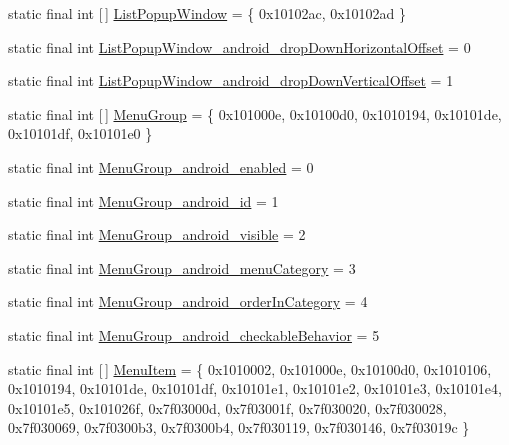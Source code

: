\begin{DoxyCompactItemize}
\item 
static final int \mbox{[}$\,$\mbox{]} \mbox{\hyperlink{classandroid_1_1support_1_1v7_1_1appcompat_1_1_r_1_1styleable_a87f1d1e417d9894ead464548553aff2c}{List\+Popup\+Window}} = \{ 0x10102ac, 0x10102ad \}
\item 
static final int \mbox{\hyperlink{classandroid_1_1support_1_1v7_1_1appcompat_1_1_r_1_1styleable_a4cd684e1cf8f45b42ae26334bcc094f8}{List\+Popup\+Window\+\_\+android\+\_\+drop\+Down\+Horizontal\+Offset}} = 0
\item 
static final int \mbox{\hyperlink{classandroid_1_1support_1_1v7_1_1appcompat_1_1_r_1_1styleable_a8c66ee61979b855940af2e36f6a6a6a0}{List\+Popup\+Window\+\_\+android\+\_\+drop\+Down\+Vertical\+Offset}} = 1
\item 
static final int \mbox{[}$\,$\mbox{]} \mbox{\hyperlink{classandroid_1_1support_1_1v7_1_1appcompat_1_1_r_1_1styleable_aef793c0a19e198b57791fed45ec2804e}{Menu\+Group}} = \{ 0x101000e, 0x10100d0, 0x1010194, 0x10101de, 0x10101df, 0x10101e0 \}
\item 
static final int \mbox{\hyperlink{classandroid_1_1support_1_1v7_1_1appcompat_1_1_r_1_1styleable_a01f2ab8d4d7690f5655245195aa803ce}{Menu\+Group\+\_\+android\+\_\+enabled}} = 0
\item 
static final int \mbox{\hyperlink{classandroid_1_1support_1_1v7_1_1appcompat_1_1_r_1_1styleable_aa28bf61b5e9fc2bc1caa2448356ffe73}{Menu\+Group\+\_\+android\+\_\+id}} = 1
\item 
static final int \mbox{\hyperlink{classandroid_1_1support_1_1v7_1_1appcompat_1_1_r_1_1styleable_af089eb8abf30585bb699a2294320dc62}{Menu\+Group\+\_\+android\+\_\+visible}} = 2
\item 
static final int \mbox{\hyperlink{classandroid_1_1support_1_1v7_1_1appcompat_1_1_r_1_1styleable_a72c3459b8e89065ee52e7671aa730693}{Menu\+Group\+\_\+android\+\_\+menu\+Category}} = 3
\item 
static final int \mbox{\hyperlink{classandroid_1_1support_1_1v7_1_1appcompat_1_1_r_1_1styleable_a7506eb5fe31e003b3fae2058ac082d38}{Menu\+Group\+\_\+android\+\_\+order\+In\+Category}} = 4
\item 
static final int \mbox{\hyperlink{classandroid_1_1support_1_1v7_1_1appcompat_1_1_r_1_1styleable_a1bcc9736c90fcc22e60ad3d40e6e54ed}{Menu\+Group\+\_\+android\+\_\+checkable\+Behavior}} = 5
\item 
static final int \mbox{[}$\,$\mbox{]} \mbox{\hyperlink{classandroid_1_1support_1_1v7_1_1appcompat_1_1_r_1_1styleable_a3161bf75811c963572105d304c98b088}{Menu\+Item}} = \{ 0x1010002, 0x101000e, 0x10100d0, 0x1010106, 0x1010194, 0x10101de, 0x10101df, 0x10101e1, 0x10101e2, 0x10101e3, 0x10101e4, 0x10101e5, 0x101026f, 0x7f03000d, 0x7f03001f, 0x7f030020, 0x7f030028, 0x7f030069, 0x7f0300b3, 0x7f0300b4, 0x7f030119, 0x7f030146, 0x7f03019c \}

\end{DoxyCompactItemize}
